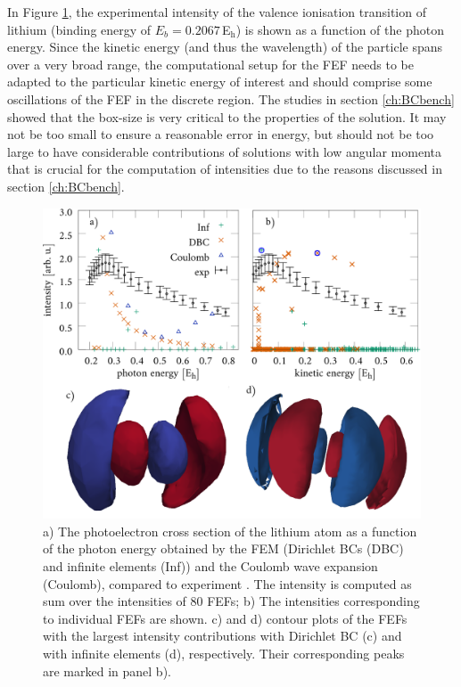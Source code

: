 In Figure \ref{fig:Li-CS}, the experimental intensity of the valence ionisation transition of lithium (binding energy of $E_b=0.2067\,$E$_\text{h}$) is shown as a function of the photon energy.
Since the kinetic energy (and thus the wavelength) of the particle spans over a very broad range, the computational setup for the FEF needs to be adapted to the particular kinetic energy of interest and should comprise some oscillations of the FEF in the discrete region.
The studies in section \ref{ch:BCbench} showed that the box-size is very critical to the properties of the solution.
It may not be too small to ensure a reasonable error in energy, but should not be too large to have considerable contributions of solutions with low angular momenta that is crucial for the computation of intensities due to the reasons discussed in section \ref{ch:BCbench}.
\begin{figure}
\includegraphics[width=\textwidth]{Figures/Lithium/CrossSect2}
\caption{a) The photoelectron cross section of the lithium atom as a function of the photon energy obtained by the FEM (Dirichlet BCs (DBC) and infinite elements (Inf)) and the Coulomb wave expansion (Coulomb), compared to experiment \cite{LiCS}.
The intensity is computed as sum over the intensities of $80$ FEFs;
b) The intensities corresponding to individual FEFs are shown.
c) and d) contour plots of the FEFs with the largest intensity contributions with Dirichlet BC (c) and with infinite elements (d), respectively.
Their corresponding peaks are marked in panel b). }
\label{fig:Li-CS}
\end{figure}
